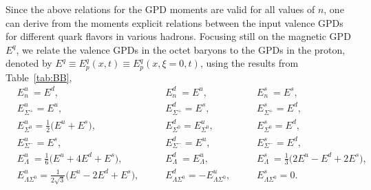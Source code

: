 \documentclass[preprintnumbers,prd,superscriptaddress,preprint]{revtex4-1}
\begin{document}
Since the above relations for the GPD moments are valid for all values of $n$, one can derive from the moments explicit relations between the input valence GPDs for different quark flavors in various hadrons.
Focusing still on the magnetic GPD $E^q$, we relate the valence GPDs in the octet baryons to the GPDs in the proton, denoted by
        $E^q \equiv E^q_p(x,t) \equiv E^q_p(x,\xi=0,t)$,
using the results from Table~\ref{tab:BB}, 
%
%
%
\begin{subequations}
\begin{alignat}{3}
 & E^u_n\ = E^d,
&& E^d_n\ = E^u,
&& E^s_n\ = E^s,
\\
 & E^u_{\Sigma^+}\!= E^u,
&& E^d_{\Sigma^+}\!= E^s,
&& E^s_{\Sigma^+}\!= E^d,
\\
 & E^u_{\Sigma^0} = \frac12 \big( E^u + E^s \big),
&& E^d_{\Sigma^0} = E^u_{\Sigma^0},
&& E^s_{\Sigma^0} = E^d,
\\
 & E^u_{\Sigma^-}\!= E^s,
&& E^d_{\Sigma^-}\!= E^u,
&& E^s_{\Sigma^-}\!= E^d,
\\
 & E^u_{\Lambda}\ = \frac16 \big( E^u+4E^d+E^s \big),
&& E^d_{\Lambda}\ = E^u_\Lambda,
&& E^s_{\Lambda}\ = \frac13 \big( 2E^u-E^d+2E^s \big),
\\
 & E^u_{\Lambda\Sigma^0}\!= \frac{1}{2\sqrt3} \big( E^u-2E^d+E^s \big),~~~~~
&& E^d_{\Lambda\Sigma^0}\!= -E^u_{\Lambda\Sigma^0},~~~~~ 
&& E^s_{\Lambda\Sigma^0}\!= 0.
\end{alignat}
\end{subequations}
\end{document}
